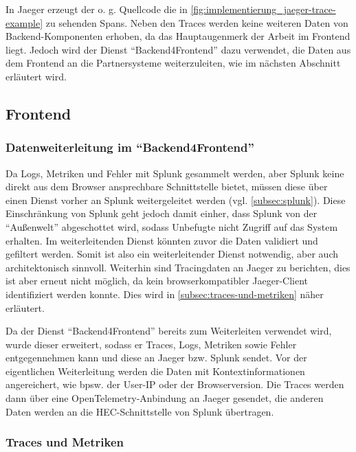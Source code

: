 In Jaeger erzeugt der o. g. Quellcode die in \autoref{fig:implementierung_jaeger-trace-example} zu sehenden Spans. Neben den Traces werden keine weiteren Daten von Backend-Komponenten erhoben, da das Hauptaugenmerk der Arbeit im Frontend liegt. Jedoch wird der Dienst \enquote{Backend4Frontend} dazu verwendet, die Daten aus dem Frontend an die Partnersysteme weiterzuleiten, wie im nächsten Abschnitt erläutert wird.

\subsection{Frontend}

\subsubsection{Datenweiterleitung im \enquote{Backend4Frontend}}

Da Logs, Metriken und Fehler mit Splunk gesammelt werden, aber Splunk keine direkt aus dem Browser ansprechbare Schnittstelle bietet, müssen diese über einen Dienst vorher an Splunk weitergeleitet werden (vgl. \autoref{subsec:splunk}). Diese Einschränkung von Splunk geht jedoch damit einher, dass Splunk von der \enquote{Außenwelt} abgeschottet wird, sodass Unbefugte nicht Zugriff auf das System erhalten. Im weiterleitenden Dienst könnten zuvor die Daten validiert und gefiltert werden. Somit ist also ein weiterleitender Dienst notwendig, aber auch architektonisch sinnvoll. Weiterhin sind Tracingdaten an Jaeger zu berichten, dies ist aber erneut nicht möglich, da kein browserkompatibler Jaeger-Client identifiziert werden konnte. Dies wird in \autoref{subsec:traces-und-metriken} näher erläutert.

Da der Dienst \enquote{Backend4Frontend} bereits zum Weiterleiten verwendet wird, wurde dieser erweitert, sodass er Traces, Logs, Metriken sowie Fehler entgegennehmen kann und diese an Jaeger bzw. Splunk sendet. Vor der eigentlichen Weiterleitung werden die Daten mit Kontextinformationen angereichert, wie bpsw. der User-IP oder der Browserversion. Die Traces werden dann über eine OpenTelemetry-Anbindung an Jaeger gesendet, die anderen Daten werden an die HEC-Schnittstelle \cite{SplunkHEC} von Splunk übertragen.

\subsubsection{Traces und Metriken}
\label{subsec:traces-und-metriken}

